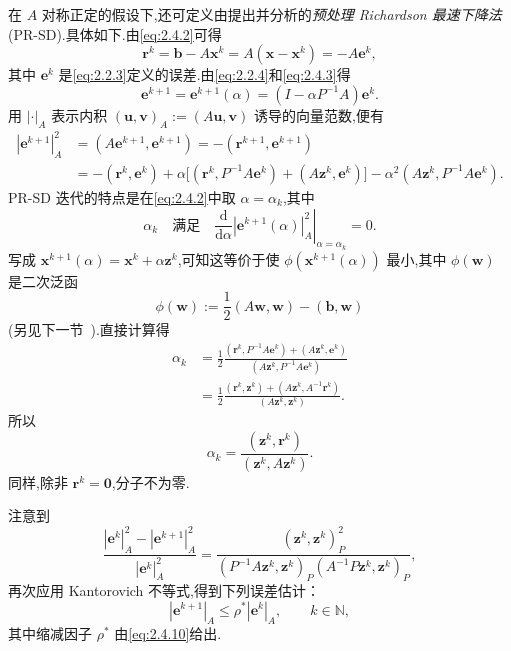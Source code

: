在 \(A\) 对称正定的假设下,还可定义由提出并分析的\emph{预处理 Richardson 最速下降法}(PR-SD).具体如下.由\eqref{eq:2.4.2}可得
\[
  \boldsymbol{r}^k=\boldsymbol{b}-A\boldsymbol{x}^k=A(\boldsymbol{x}-\boldsymbol{x}^k)=-A\boldsymbol{e}^k,
\]
其中 \(\boldsymbol{e}^k\) 是\eqref{eq:2.2.3}定义的误差.由\eqref{eq:2.2.4}和\eqref{eq:2.4.3}得
\[
  \boldsymbol{e}^{k+1}=\boldsymbol{e}^{k+1}(\alpha)=(I-\alpha P^{-1}A)\boldsymbol{e}^k.
\]
用 \(|\cdot|_A\) 表示内积 \((\boldsymbol{u},\boldsymbol{v})_A:=(A\boldsymbol{u},\boldsymbol{v})\) 诱导的向量范数,便有
\[
  \begin{aligned}
    |\boldsymbol{e}^{k+1}|_A^2
    &=(A\boldsymbol{e}^{k+1},\boldsymbol{e}^{k+1})=-(\boldsymbol{r}^{k+1},\boldsymbol{e}^{k+1})\\
    &=-(\boldsymbol{r}^k,\boldsymbol{e}^k)
       +\alpha\bigl[(\boldsymbol{r}^k,P^{-1}A\boldsymbol{e}^k)+(A\boldsymbol{z}^k,\boldsymbol{e}^k)\bigr]
       -\alpha^2(A\boldsymbol{z}^k,P^{-1}A\boldsymbol{e}^k).
  \end{aligned}
\]
PR-SD 迭代的特点是在\eqref{eq:2.4.2}中取 \(\alpha=\alpha_k\),其中
\begin{equation}\label{eq:2.4.15}
  \alpha_k\quad\text{满足}\quad
  \left.\frac{\mathrm d}{\mathrm d\alpha}|\boldsymbol{e}^{k+1}(\alpha)|_A^2\right|_{\alpha=\alpha_k}=0.
\end{equation}
写成 \(\boldsymbol{x}^{k+1}(\alpha)=\boldsymbol{x}^k+\alpha\boldsymbol{z}^k\),可知这等价于使 \(\phi(\boldsymbol{x}^{k+1}(\alpha))\) 最小,其中 \(\phi(\boldsymbol{w})\) 是二次泛函
\[
  \phi(\boldsymbol{w}):=\frac12(A\boldsymbol{w},\boldsymbol{w})-(\boldsymbol{b},\boldsymbol{w})
\]
(另见下一节~).直接计算得
\[
  \begin{aligned}
    \alpha_k
    &=\frac12\frac{(\boldsymbol{r}^k,P^{-1}A\boldsymbol{e}^k)+(A\boldsymbol{z}^k,\boldsymbol{e}^k)}
                   {(A\boldsymbol{z}^k,P^{-1}A\boldsymbol{e}^k)}\\
    &=\frac12\frac{(\boldsymbol{r}^k,\boldsymbol{z}^k)+(A\boldsymbol{z}^k,A^{-1}\boldsymbol{r}^k)}
                   {(A\boldsymbol{z}^k,\boldsymbol{z}^k)}.
  \end{aligned}
\]
所以
\begin{equation}\label{eq:2.4.16}
  \alpha_k=\frac{(\boldsymbol{z}^k,\boldsymbol{r}^k)}{(\boldsymbol{z}^k,A\boldsymbol{z}^k)}.
\end{equation}
同样,除非 \(\boldsymbol{r}^k=\boldsymbol{0}\),分子不为零.

注意到
\[
  \frac{|\boldsymbol{e}^k|_A^2-|\boldsymbol{e}^{k+1}|_A^2}{|\boldsymbol{e}^k|_A^2}
   =\frac{(\boldsymbol{z}^k,\boldsymbol{z}^k)_P^2}
          {(P^{-1}A\boldsymbol{z}^k,\boldsymbol{z}^k)_P(A^{-1}P\boldsymbol{z}^k,\boldsymbol{z}^k)_P},
\]
再次应用 Kantorovich 不等式,得到下列误差估计：
\begin{equation}\label{eq:2.4.17}
  |\boldsymbol{e}^{k+1}|_A\le\rho^*|\boldsymbol{e}^k|_A,\qquad k\in\mathbb N,
\end{equation}
其中缩减因子 \(\rho^*\) 由\eqref{eq:2.4.10}给出.

